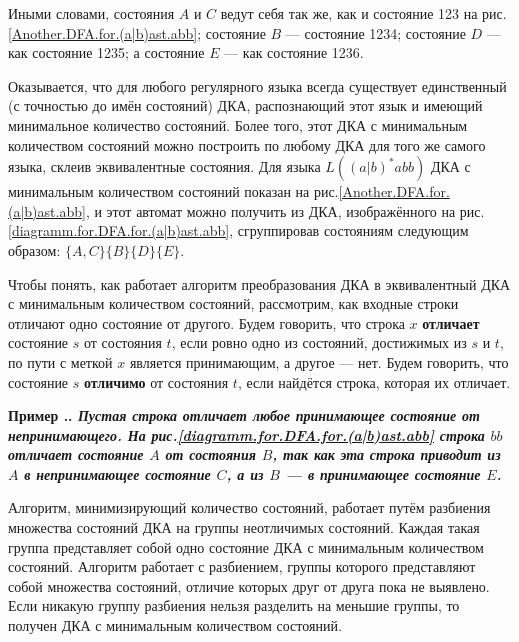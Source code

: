 \documentclass[10pt]{report}
\newcounter{exam}[section]
\renewcommand{\theexam}{\thesection.\arabic{exam}}
\newenvironment{Example}{\par\refstepcounter{exam}\bf Пример \theexam. \sl}{\rm\par}
\begin{document}
Иными словами, состояния $A$ и $C$ ведут себя так же, как и состояние 123 на рис.\ref{Another.DFA.for.(a|b)ast.abb}; состояние $B$ --- состояние 1234; состояние $D$ --- как
состояние 1235; а состояние $E$ --- как состояние 1236.

Оказывается, что для любого регулярного языка всегда существует единственный (с точностью до имён состояний) ДКА, распознающий этот язык и имеющий минимальное количество
состояний. Более того, этот ДКА с минимальным количеством состояний можно построить по любому ДКА для того же самого языка, склеив эквивалентные сос\-тояния. Для языка
$L((a|b)^*abb)$ ДКА с минимальным количеством сос\-тояний показан на рис.\ref{Another.DFA.for.(a|b)ast.abb}, и этот автомат можно получить из ДКА, изображённого на
рис.\ref{diagramm.for.DFA.for.(a|b)ast.abb}, сгруппировав состояниям следующим образом: $\{A,C\}\{B\}\{D\}\{E\}$.

Чтобы понять, как работает алгоритм преобразования ДКА в эквивалентный ДКА с минимальным количеством состояний, рассмотрим, как входные строки отличают одно состояние от
другого. Будем говорить, что строка $x$ \textbf{отличает} состояние $s$ от состояния $t$, если ровно одно из состояний, достижимых из $s$ и $t$, по пути с меткой $x$
является принимающим, а другое --- нет. Будем говорить, что состояние $s$ \textbf{отличимо} от состояния $t$, если найдётся строка, которая их отличает.
\begin{Example}
Пустая строка отличает любое принимающее состояние от непринимающего. На рис.\ref{diagramm.for.DFA.for.(a|b)ast.abb} строка $bb$ отличает состояние $A$ от состояния $B$, так
как эта строка приводит из $A$ в непринимающее состояние $C$, а из $B$ --- в принимающее состояние $E$.
\end{Example}

Алгоритм, минимизирующий количество состояний, работает путём разбиения множества состояний ДКА на группы неотличимых состояний. Каждая такая группа представляет собой одно
состояние ДКА с минимальным количеством состояний. Алгоритм работает с разбиением, группы которого представляют собой множества состояний, отличие которых друг от друга пока
не выявлено. Если никакую группу разбиения нельзя разделить на меньшие группы, то получен ДКА с минимальным количеством состояний.
\end{document}
